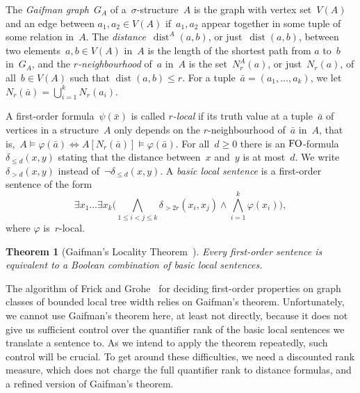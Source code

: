 \documentclass[11pt]{article}
\newtheorem{theorem}{Theorem}[section]
\numberwithin{equation}{section}
\newcommand{\FO}{\textup{FO}}
\newcommand{\dist}{\operatorname{dist}}
\renewcommand{\phi}{\varphi}
\newcommand{\tup}[1]{\bar{#1}}
\begin{document}
The \emph{Gaifman graph}~$G_A$ of a~$\sigma$-structure~$A$ is the
graph with vertex set~$V(A)$ and an edge between
$a_1,a_2\in V(A)$ if~$a_1,a_2$ appear together in some tuple of some
relation in~$A$. The \emph{distance}~$\dist^A(a,b)$, or just~$\dist(a,b)$, between two
elements~$a,b\in V(A)$ in~$A$ is the length of the shortest path from
$a$ to~$b$ in~$G_A$, and the \emph{$r$-neighbourhood} of~$a$ in~$A$ is
the set~$N_r^A(a)$, or just~$N_r(a)$, of all~$b\in V(A)$ such that
$\dist(a,b)\le r$. For a tuple~$\tup a=(a_1,\ldots,a_k)$, we let
$N_r(\tup a)=\bigcup_{i=1}^kN_r(a_i)$.

A first-order formula~$\psi(\tup x)$ is called \emph{$r$-local} if its
truth value at a  tuple~$\tup a$ of vertices in a structure~$A$ only depends on the
$r$-neighbourhood of~$\tup a$ in~$A$, that is,~$A\models\phi(\tup
a)\iff A[N_r(\tup a)]\models\phi(\tup a)$.  For all~$d\ge 0$ there is an
$\FO$-formula~$\delta_{\le d}(x,y)$ stating that the distance between~$x$ and~$y$ is
at most~$d$. We write~$\delta_{>d}(x,y)$ instead of~$\neg\delta_{\le
  d}(x,y)$. A \emph{basic
  local sentence} is a first-order sentence of the form 
\begin{equation}
  \label{eq:basic-local}
  \exists x_1\ldots\exists
x_k\big(\bigwedge_{1\le i<j\le
  k}\delta_{>2r}(x_i,x_j)\wedge\bigwedge_{i=1}^k\phi(x_i)\big),
\end{equation}
where
$\phi$ is~$r$-local.  

\begin{theorem}[Gaifman's Locality Theorem~\cite{Gaifman82}]
  Every first-order sentence is equivalent to a Boolean combination of
  basic local sentences.
\end{theorem}

The algorithm of Frick and Grohe~\cite{frigro01}
for deciding first-order properties on graph classes of bounded local
tree width relies on Gaifman's theorem. Unfortunately, we cannot use
Gaifman's theorem here, at least not directly, because it does not give us sufficient
control over the quantifier rank of the basic local sentences we
translate a sentence to. As we intend to apply the theorem repeatedly,
such control will be crucial. To get around these difficulties, we
need a discounted rank measure, which does not charge the full
quantifier rank to distance formulas,  and a refined version of
Gaifman's theorem.



\end{document}

